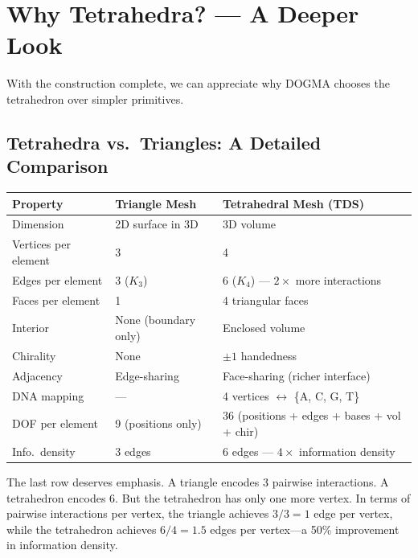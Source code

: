 \section{Why Tetrahedra? --- A Deeper Look}
\label{sec:why-tetra}

With the construction complete, we can appreciate why DOGMA chooses the
tetrahedron over simpler primitives.

\subsection{Tetrahedra vs.\ Triangles: A Detailed Comparison}

\begin{center}
\renewcommand{\arraystretch}{1.15}
\begin{tabularx}{0.95\textwidth}{L{3cm} L{4cm} Y}
\toprule
\textbf{Property} & \textbf{Triangle Mesh} & \textbf{Tetrahedral Mesh (TDS)} \\
\midrule
Dimension & 2D surface in 3D & 3D volume \\
Vertices per element & 3 & 4 \\
Edges per element & 3 ($K_3$) & 6 ($K_4$) --- $2\times$ more interactions \\
Faces per element & 1 & 4 triangular faces \\
Interior & None (boundary only) & Enclosed volume \\
Chirality & None & $\pm 1$ handedness \\
Adjacency & Edge-sharing & Face-sharing (richer interface) \\
DNA mapping & --- & 4 vertices $\leftrightarrow$ \{A, C, G, T\} \\
DOF per element & 9 (positions only) & 36 (positions + edges + bases + vol + chir) \\
Info.\ density & 3 edges & 6 edges --- $4\times$ information density\\
\bottomrule
\end{tabularx}
\end{center}

The last row deserves emphasis. A triangle encodes 3 pairwise interactions.
A tetrahedron encodes 6. But the tetrahedron has only one more vertex.
In terms of pairwise interactions per vertex, the triangle achieves
$3/3 = 1$ edge per vertex, while the tetrahedron achieves $6/4 = 1.5$ edges per
vertex---a 50\% improvement in information density.


